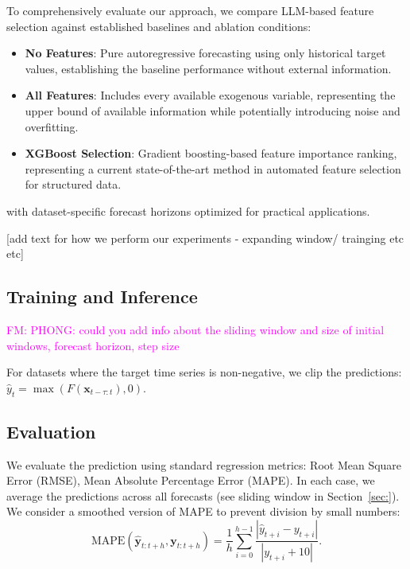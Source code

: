 \documentclass[conference]{IEEEtran}
\newcommand{\fm}[1]{\textcolor{magenta}{FM: #1}}
\begin{document}
To comprehensively evaluate our approach, we compare LLM-based feature selection against established baselines and ablation conditions:
\begin{itemize}
\item \textbf{No Features}: Pure autoregressive forecasting using only historical target values, establishing the baseline performance without external information.
\item \textbf{All Features}: Includes every available exogenous variable, representing the upper bound of available information while potentially introducing noise and overfitting.
\item \textbf{XGBoost Selection}: Gradient boosting-based feature importance ranking, representing a current state-of-the-art method in automated feature selection for structured data.
\end{itemize}






with dataset-specific forecast horizons optimized for practical applications.


[add text for how we perform our experiments - expanding window/ trainging etc etc]

\subsection{Training and Inference}

\fm{PHONG: could you add info about the sliding window and size of initial windows, forecast horizon, step size}

For datasets where the target time series is non-negative, we clip the predictions: $\widehat{y}_t = \max(F(\mathbf{x}_{t-\tau:t}), 0)$.


\subsection{Evaluation}



We evaluate the prediction using standard regression metrics: Root Mean Square Error (RMSE), Mean Absolute Percentage Error (MAPE). In each case, we average the predictions across all forecasts (see sliding window in Section~\ref{sec:}). We consider a smoothed version of MAPE to prevent division by small numbers:
\begin{equation}\label{eq:smooth_mape}
    \mathrm{MAPE}(\mathbf{\widehat{y}}_{t:t+h},\mathbf{y}_{t:t+h}) = \frac{1}{h}\sum_{i=0}^{h-1}\frac{|\widehat{y}_{t+i} - y_{t+i}|}{|y_{t+i}+10|}.
\end{equation}
\end{document}
